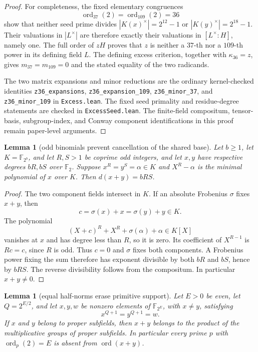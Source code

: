 \documentclass[11pt]{article}
\newtheorem{lemma}[theorem]{Lemma}
\theoremstyle{definition}
\theoremstyle{remark}
\begin{document}
\begin{proof}
For completeness, the fixed elementary congruences
\[
 \operatorname{ord}_{37}(2)=\operatorname{ord}_{109}(2)=36
\]
show that neither seed prime divides $|K(x)^\times|=2^{12}-1$ or
$|K(y)^\times|=2^{18}-1$. Their valuations in $|L^\times|$ are therefore
exactly their valuations in $[L^\times:H]$, namely one. The full order of
$zH$ proves that $z$ is neither a $37$-th nor a $109$-th power in its
defining field $L$. The defining excess criterion, together with
$\kappa_{36}=z$, gives $m_{37}=m_{109}=0$ and the stated equality of the
two radicands.

The two matrix expansions and minor reductions are the ordinary
kernel-checked identities \texttt{z36\_expansions},
\texttt{z36\_expansion\_109}, \texttt{z36\_minor\_37}, and
\texttt{z36\_minor\_109} in \texttt{Excess.lean}. The fixed seed primality
and residue-degree statements are checked in \texttt{ExcessSeed.lean}.
The finite-field compositum, tensor-basis, subgroup-index, and Conway
component identifications in this proof remain paper-level arguments.
\end{proof}

\begin{lemma}[odd binomials prevent cancellation of the shared base]
\label{lem:equal-norm-degree}
Let $b\geq1$, let $K=\mathbb F_{2^b}$, and let $R,S>1$ be coprime odd integers, and let
$x,y$ have respective degrees $bR,bS$ over $\mathbb F_2$.  Suppose
$x^R=y^S=\alpha\in K$ and $X^R-\alpha$ is the minimal polynomial of $x$
over $K$.  Then $d(x+y)=bRS$.
\end{lemma}

\begin{proof}
The two component fields intersect in $K$.  If an absolute Frobenius
$\sigma$ fixes $x+y$, then
\[
 c=\sigma(x)+x=\sigma(y)+y\in K.
\]
The polynomial
\[
 (X+c)^R+X^R+\sigma(\alpha)+\alpha\in K[X]
\]
vanishes at $x$ and has degree less than $R$, so it is zero.  Its coefficient
of $X^{R-1}$ is $Rc=c$, since $R$ is odd.  Thus $c=0$ and $\sigma$ fixes
both components.  A Frobenius power fixing the sum therefore has exponent
divisible by both $bR$ and $bS$, hence by $bRS$.  The reverse divisibility
follows from the compositum.  In particular $x+y\ne0$.
\end{proof}

\begin{lemma}[equal half-norms erase primitive support]
\label{lem:equal-norm-support}
Let $E>0$ be even, let $Q=2^{E/2}$, and let $x,y,w$ be nonzero elements of
$\mathbb F_{2^E}$, with $x\ne y$, satisfying
\[
 x^{Q+1}=y^{Q+1}=w.
\]
If $x$ and $y$ belong to proper subfields, then $x+y$ belongs to the product
of the multiplicative groups of proper subfields.  In particular every prime
$p$ with $\operatorname{ord}_p(2)=E$ is absent from
$\operatorname{ord}(x+y)$.
\end{lemma}
\end{document}
